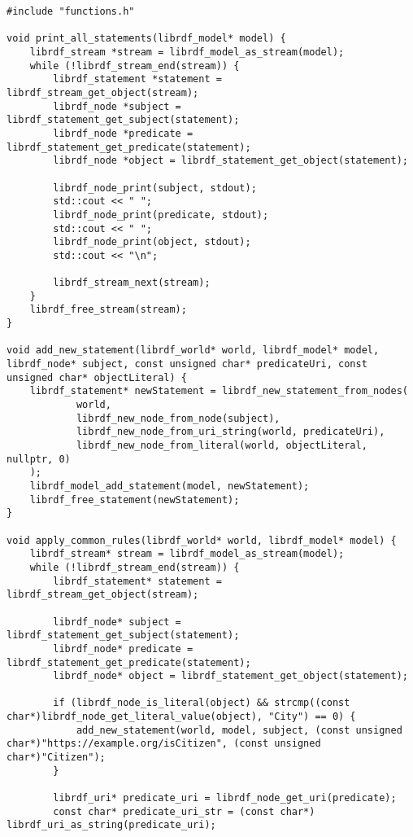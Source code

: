 \documentclass[12pt, a4paper]{article}
\begin{document}
\begin{verbatim}
#include "functions.h"

void print_all_statements(librdf_model* model) {
    librdf_stream *stream = librdf_model_as_stream(model);
    while (!librdf_stream_end(stream)) {
        librdf_statement *statement = librdf_stream_get_object(stream);
        librdf_node *subject = librdf_statement_get_subject(statement);
        librdf_node *predicate = librdf_statement_get_predicate(statement);
        librdf_node *object = librdf_statement_get_object(statement);

        librdf_node_print(subject, stdout);
        std::cout << " ";
        librdf_node_print(predicate, stdout);
        std::cout << " ";
        librdf_node_print(object, stdout);
        std::cout << "\n";

        librdf_stream_next(stream);
    }
    librdf_free_stream(stream);
}

void add_new_statement(librdf_world* world, librdf_model* model, librdf_node* subject, const unsigned char* predicateUri, const unsigned char* objectLiteral) {
    librdf_statement* newStatement = librdf_new_statement_from_nodes(
            world,
            librdf_new_node_from_node(subject),
            librdf_new_node_from_uri_string(world, predicateUri),
            librdf_new_node_from_literal(world, objectLiteral, nullptr, 0)
    );
    librdf_model_add_statement(model, newStatement);
    librdf_free_statement(newStatement);
}

void apply_common_rules(librdf_world* world, librdf_model* model) {
    librdf_stream* stream = librdf_model_as_stream(model);
    while (!librdf_stream_end(stream)) {
        librdf_statement* statement = librdf_stream_get_object(stream);

        librdf_node* subject = librdf_statement_get_subject(statement);
        librdf_node* predicate = librdf_statement_get_predicate(statement);
        librdf_node* object = librdf_statement_get_object(statement);

        if (librdf_node_is_literal(object) && strcmp((const char*)librdf_node_get_literal_value(object), "City") == 0) {
            add_new_statement(world, model, subject, (const unsigned char*)"https://example.org/isCitizen", (const unsigned char*)"Citizen");
        }

        librdf_uri* predicate_uri = librdf_node_get_uri(predicate);
        const char* predicate_uri_str = (const char*) librdf_uri_as_string(predicate_uri);


\end{verbatim}
\end{document}

